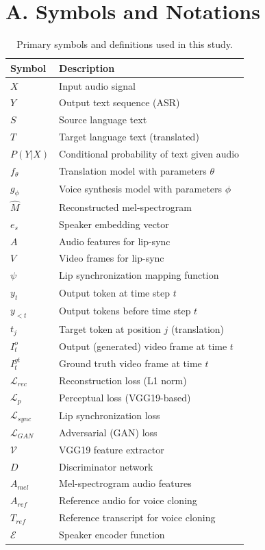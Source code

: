 \documentclass[12pt,oneside]{report}
\begin{document}
\section*{A. Symbols and Notations}

\begin{table}[H]
\centering
\caption{Primary symbols and definitions used in this study.}
\label{tab:symbols}
\renewcommand{\arraystretch}{1.05}
\setlength{\tabcolsep}{4.5pt}
\small
\begin{tabular}{@{}ll@{}}
\toprule
\textbf{Symbol} & \textbf{Description} \\
\midrule
$X$ & Input audio signal \\
$Y$ & Output text sequence (ASR) \\
$S$ & Source language text \\
$T$ & Target language text (translated) \\
$P(Y|X)$ & Conditional probability of text given audio \\
$f_{\theta}$ & Translation model with parameters $\theta$ \\
$g_{\phi}$ & Voice synthesis model with parameters $\phi$ \\
$\hat{M}$ & Reconstructed mel-spectrogram \\
$e_s$ & Speaker embedding vector \\
$A$ & Audio features for lip-sync \\
$V$ & Video frames for lip-sync \\
$\psi$ & Lip synchronization mapping function \\
$y_t$ & Output token at time step $t$ \\
$y_{<t}$ & Output tokens before time step $t$ \\
$t_j$ & Target token at position $j$ (translation) \\
$I_t^o$ & Output (generated) video frame at time $t$ \\
$I_t^{gt}$ & Ground truth video frame at time $t$ \\
$\mathcal{L}_{rec}$ & Reconstruction loss (L1 norm) \\
$\mathcal{L}_p$ & Perceptual loss (VGG19-based) \\
$\mathcal{L}_{sync}$ & Lip synchronization loss \\
$\mathcal{L}_{GAN}$ & Adversarial (GAN) loss \\
$\mathcal{V}$ & VGG19 feature extractor \\
$D$ & Discriminator network \\
$A_{mel}$ & Mel-spectrogram audio features \\
$A_{ref}$ & Reference audio for voice cloning \\
$T_{ref}$ & Reference transcript for voice cloning \\
$\mathcal{E}$ & Speaker encoder function \\
\bottomrule
\end{tabular}
\end{table}
\end{document}
